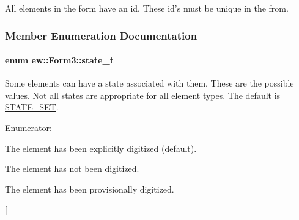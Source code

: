 All elements in the form have an id. These id's must be unique in the from. 

\subsubsection{Member Enumeration Documentation}
\hypertarget{classew_1_1Form3_a0fb1f90f8936fc647de8bf351aa0f725}{
\paragraph[{state\_\-t}]{\setlength{\rightskip}{0pt plus 5cm}enum {\bf ew::Form3::state\_\-t}}\hfill}
\label{classew_1_1Form3_a0fb1f90f8936fc647de8bf351aa0f725}
Some elements can have a state associated with them. These are the possible values. Not all states are appropriate for all element types. The default is \hyperlink{classew_1_1Form3_a0fb1f90f8936fc647de8bf351aa0f725acce88d69a207a761cb9d267bf36a4882}{STATE\_\-SET}. \begin{Desc}
\item[Enumerator: ]\par
\begin{description}
\item[{\em 
\hypertarget{classew_1_1Form3_a0fb1f90f8936fc647de8bf351aa0f725acce88d69a207a761cb9d267bf36a4882}{
STATE\_\-SET}
\label{classew_1_1Form3_a0fb1f90f8936fc647de8bf351aa0f725acce88d69a207a761cb9d267bf36a4882}
}]The element has been explicitly digitized (default). \item[{\em 
\hypertarget{classew_1_1Form3_a0fb1f90f8936fc647de8bf351aa0f725afc4f92640e5a0ba7ba025265300df60d}{
STATE\_\-UNSET}
\label{classew_1_1Form3_a0fb1f90f8936fc647de8bf351aa0f725afc4f92640e5a0ba7ba025265300df60d}
}]The element has not been digitized. \item[{\em 
\hypertarget{classew_1_1Form3_a0fb1f90f8936fc647de8bf351aa0f725a7c68944bfd7af307bf1097e3f6a98647}{
STATE\_\-PROVISIONAL}
\label{classew_1_1Form3_a0fb1f90f8936fc647de8bf351aa0f725a7c68944bfd7af307bf1097e3f6a98647}
}]The element has been provisionally digitized. \item[{\em 
}
\end{description}
\end{Desc}
